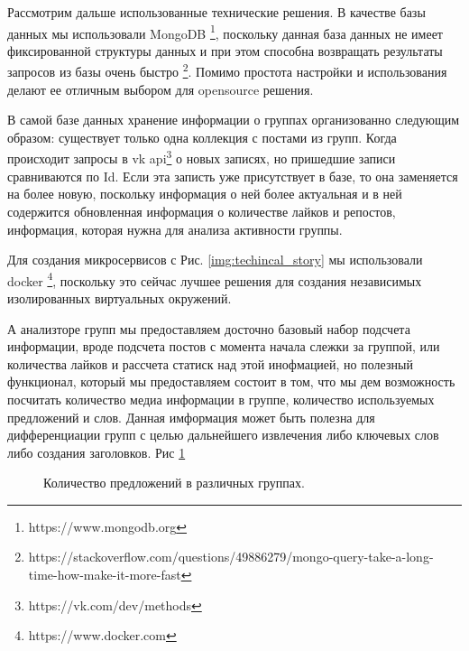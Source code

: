 \documentclass[14pt]{matmex-diploma-custom}
\begin{document}
Рассмотрим дальше использованные технические решения. В качестве базы данных мы использовали MongoDB \footnote{https://www.mongodb.org}, поскольку данная база данных не имеет фиксированной структуры данных и при этом способна возвращать результаты запросов из базы очень быстро \footnote{https://stackoverflow.com/questions/49886279/mongo-query-take-a-long-time-how-make-it-more-fast}. Помимо простота настройки и использования делают ее отличным выбором для opensource решения.

В самой базе данных хранение информации о группах организованно следующим образом: существует только одна коллекция с постами из групп. Когда происходит запросы в vk api\footnote{https://vk.com/dev/methods} о новых записях, но пришедшие записи сравниваются по Id. Если эта записть уже присутствует в базе, то она заменяется на более новую, поскольку информация о ней более актуальная и в ней содержится обновленная информация о количестве лайков и репостов, информация, которая нужна для анализа активности группы.

Для создания микросервисов с Рис. \ref{img:techincal_story} мы использовали docker \footnote{https://www.docker.com}, поскольку это сейчас лучшее решения для создания независимых изолированных виртуальных окружений.

А анализторе групп мы предоставляем досточно базовый набор подсчета информации, вроде подсчета постов с момента начала слежки за группой, или количества лайков и рассчета статиск над этой инофмацией, но полезный функционал, который мы предоставляем состоит в том, что мы дем возможность посчитать количество медиа информации в группе, количество используемых предложений и слов. Данная имформация может быть полезна для дифференциации групп с целью дальнейшего извлечения либо ключевых слов либо создания заголовков. Рис \ref{img:sentence_counts}

\begin{figure}[ht]
\begin{center}


\caption{
\label{img:sentence_counts} Количество предложений в различных группах.
        }
\end {center}
\end {figure}
\end{document}

